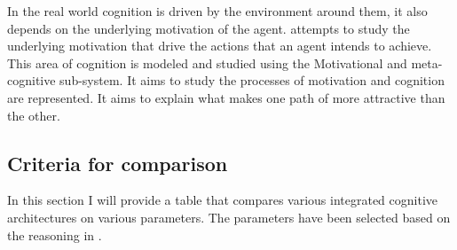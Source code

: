 In the real world cognition is driven by the environment around them,
it also depends on the underlying motivation of the agent. \clarion
attempts to study the underlying motivation that drive the
actions that an agent intends to achieve. This area of cognition is
modeled and studied using the Motivational and meta-cognitive
sub-system. It aims to study the processes of motivation and cognition
are represented\cite{Sun:2003aa}. It aims to explain what makes one
path of more attractive than the other. 




\subsection{Criteria for comparison}
In this section I will provide a table that compares various
integrated cognitive architectures on various parameters. The
parameters have been selected based on the reasoning in
\cite{CambridgeJournals:207162}.

